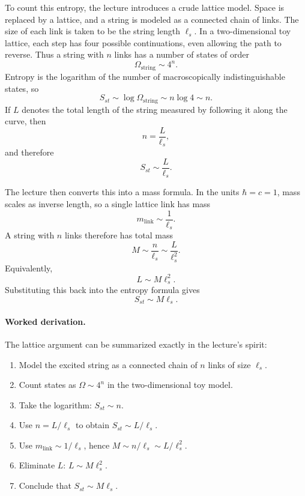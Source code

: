 To count this entropy, the lecture introduces a crude lattice model. Space is replaced by a lattice, and a string is modeled as a connected chain of links. The size of each link is taken to be the string length \(\ell_s\). In a two-dimensional toy lattice, each step has four possible continuations, even allowing the path to reverse. Thus a string with \(n\) links has a number of states of order
\begin{equation}
\Omega_{\text{string}}\sim 4^n.
\end{equation}
Entropy is the logarithm of the number of macroscopically indistinguishable states, so
\begin{equation}
S_{st}\sim \log \Omega_{\text{string}}\sim n\log 4\sim n.
\end{equation}
If \(L\) denotes the total length of the string measured by following it along the curve, then
\begin{equation}
n=\frac{L}{\ell_s},
\end{equation}
and therefore
\begin{equation}
S_{st}\sim \frac{L}{\ell_s}.
\end{equation}

The lecture then converts this into a mass formula. In the units \(\hbar=c=1\), mass scales as inverse length, so a single lattice link has mass
\begin{equation}
m_{\text{link}}\sim \frac{1}{\ell_s}.
\end{equation}
A string with \(n\) links therefore has total mass
\begin{equation}
M\sim \frac{n}{\ell_s}\sim \frac{L}{\ell_s^2}.
\end{equation}
Equivalently,
\begin{equation}
L\sim M\ell_s^2.
\end{equation}
Substituting this back into the entropy formula gives
\begin{equation}
S_{st}\sim M\ell_s.
\end{equation}

\paragraph{Worked derivation.}
The lattice argument can be summarized exactly in the lecture's spirit:
\begin{enumerate}
\item Model the excited string as a connected chain of \(n\) links of size \(\ell_s\).
\item Count states as \(\Omega\sim 4^n\) in the two-dimensional toy model.
\item Take the logarithm: \(S_{st}\sim n\).
\item Use \(n=L/\ell_s\) to obtain \(S_{st}\sim L/\ell_s\).
\item Use \(m_{\text{link}}\sim 1/\ell_s\), hence \(M\sim n/\ell_s\sim L/\ell_s^2\).
\item Eliminate \(L\): \(L\sim M\ell_s^2\).
\item Conclude that \(S_{st}\sim M\ell_s\).
\end{enumerate}

